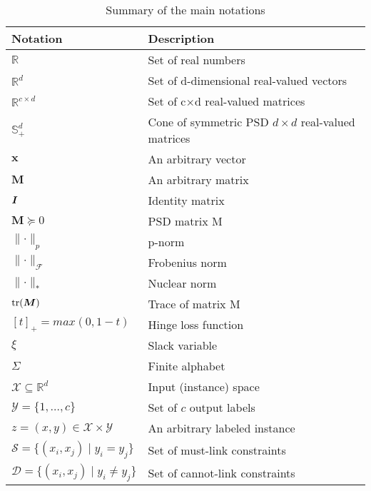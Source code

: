 
\begin{table}[ht] \centering
\caption{Summary of the main notations} \label{tab:notation}
\begin{tabular}{ll}
\hline
Notation & Description \\
\hline

$\mathbb{R}$ & Set of real numbers \\
$\mathbb{R}^d$ & Set of d-dimensional real-valued vectors \\
$\mathbb{R}^{c \times d}$ & Set of c$\times$d real-valued matrices \\
$\mathbb{S}^{d}_+$ & Cone of symmetric PSD $d \times d$ real-valued matrices \\

$\textbf{x}$ & An arbitrary vector \\
$\bm{M}$ & An arbitrary matrix \\
$\textbf{\textit{I}}$ & Identity matrix \\
$\bm{M} \succeq 0$ & PSD matrix M \\
$\parallel \cdot \parallel_p$ & p-norm \\
$\parallel \cdot \parallel_\mathcal{F}$ & Frobenius norm \\
$\parallel \cdot \parallel_*$ & Nuclear norm \\
$\operatorname{tr}(\bm{M})$ & Trace of matrix M \\
$[t]_+ = max(0, 1-t)$ & Hinge loss function \\
$\xi$ & Slack variable \\
$\Sigma$ & Finite alphabet \\

$\mathcal{X} \subseteq \mathbb{R}^d$ & Input (instance) space \\
$\mathcal{Y} = \{ 1, \ldots ,c \}$ & Set of $c$ output labels \\
$z=(x,y) \in \mathcal{X} \times \mathcal{Y}$ & An arbitrary labeled instance \\

$\mathcal{S} = \{ (x_i, x_j) \mid y_i = y_j \}$ & Set of must-link constraints \\
$\mathcal{D} = \{ (x_i, x_j) \mid y_i \neq y_j \}$ & Set of cannot-link constraints \\



\end{tabular}
\end{table}
